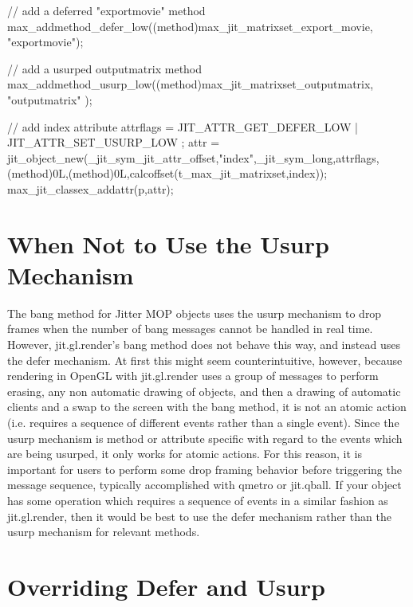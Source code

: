 \begin{DoxyCode}
// add a deferred "exportmovie" method
max_addmethod_defer_low((method)max_jit_matrixset_export_movie, "exportmovie");
    
// add a usurped outputmatrix method
max_addmethod_usurp_low((method)max_jit_matrixset_outputmatrix,    "outputmatrix"
      );

// add index attribute
attrflags = JIT_ATTR_GET_DEFER_LOW | JIT_ATTR_SET_USURP_LOW ;    
attr = jit_object_new(_jit_sym_jit_attr_offset,"index",_jit_sym_long,attrflags,
      (method)0L,(method)0L,calcoffset(t_max_jit_matrixset,index));
max_jit_classex_addattr(p,attr);
\end{DoxyCode}
\hypertarget{chapter_jit_sched_chapter_jit_sched_justsayno}{}\section{When Not to Use the Usurp Mechanism}\label{chapter_jit_sched_chapter_jit_sched_justsayno}
The bang method for Jitter MOP objects uses the usurp mechanism to drop frames when the number of bang messages cannot be handled in real time. However, jit.gl.render's bang method does not behave this way, and instead uses the defer mechanism. At first this might seem counterintuitive, however, because rendering in OpenGL with jit.gl.render uses a group of messages to perform erasing, any non automatic drawing of objects, and then a drawing of automatic clients and a swap to the screen with the bang method, it is not an atomic action (i.e. requires a sequence of different events rather than a single event). Since the usurp mechanism is method or attribute specific with regard to the events which are being usurped, it only works for atomic actions. For this reason, it is important for users to perform some drop framing behavior before triggering the message sequence, typically accomplished with qmetro or jit.qball. If your object has some operation which requires a sequence of events in a similar fashion as jit.gl.render, then it would be best to use the defer mechanism rather than the usurp mechanism for relevant methods.\hypertarget{chapter_jit_sched_chapter_jit_sched_override}{}\section{Overriding Defer and Usurp}\label{chapter_jit_sched_chapter_jit_sched_override}
